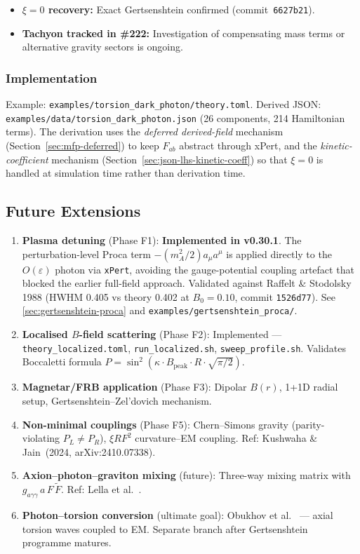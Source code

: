 \begin{itemize}
  \item \textbf{$\xi = 0$ recovery:} Exact Gertsenshtein confirmed
    (commit~\texttt{6627b21}).
  \item \textbf{Tachyon tracked in \#222:} Investigation of compensating mass terms
    or alternative gravity sectors is ongoing.
\end{itemize}

\subsubsection{Implementation}

Example: \texttt{examples/torsion\_dark\_photon/theory.toml}.
Derived JSON: \texttt{examples/data/torsion\_dark\_photon.json}
(26 components, 214 Hamiltonian terms).
The derivation uses the \emph{deferred derived-field} mechanism
(Section~\ref{sec:mfp-deferred}) to keep $F_{ab}$ abstract through xPert,
and the \emph{kinetic-coefficient} mechanism (Section~\ref{sec:json-lhs-kinetic-coeff})
so that $\xi = 0$ is handled at simulation time rather than derivation time.

\subsection{Future Extensions}
\label{subsec:future-extensions}

\begin{enumerate}
  \item \textbf{Plasma detuning} (Phase F1): \textbf{Implemented in v0.30.1}. The perturbation-level Proca term $-(m_A^2/2) a_\mu a^\mu$ is applied directly to the $O(\varepsilon)$ photon via \texttt{xPert}, avoiding the gauge-potential coupling artefact that blocked the earlier full-field approach. Validated against Raffelt \& Stodolsky 1988 (HWHM 0.405 vs theory 0.402 at $B_0=0.10$, commit \texttt{1526d77}). See \cref{sec:gertsenshtein-proca} and \texttt{examples/gertsenshtein\_proca/}.
  \item \textbf{Localised $B$-field scattering} (Phase F2): Implemented --- \texttt{theory\_localized.toml}, \texttt{run\_localized.sh}, \texttt{sweep\_profile.sh}. Validates Boccaletti formula $P = \sin^2(\kappa \cdot B_\mathrm{peak} \cdot R \cdot \sqrt{\pi/2})$.
  \item \textbf{Magnetar/FRB application} (Phase F3): Dipolar $B(r)$, 1+1D radial setup, Gertsenshtein--Zel'dovich mechanism.
  \item \textbf{Non-minimal couplings} (Phase F5): Chern--Simons gravity (parity-violating $P_L \neq P_R$), $\xi R F^2$ curvature--EM coupling. Ref: Kushwaha \& Jain~(2024, arXiv:2410.07338).
  \item \textbf{Axion--photon--graviton mixing} (future): Three-way mixing matrix with $g_{a\gamma\gamma}\, a\, F\, \tilde{F}$. Ref: Lella et al.~\cite{lella2024constraining}.
  \item \textbf{Photon--torsion conversion} (ultimate goal): Obukhov et al.~\cite{obukhov2024electrodynamics} --- axial torsion waves coupled to EM. Separate branch after Gertsenshtein programme matures.
\end{enumerate}
